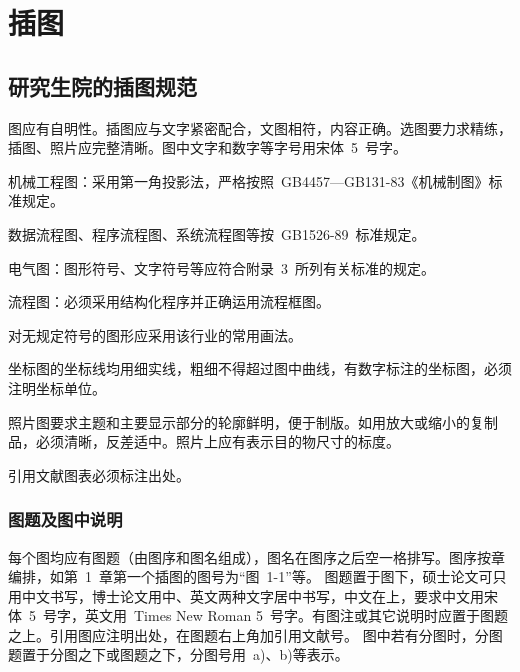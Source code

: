 
%
%
%

\chapter{插图}
\label{chap05}

\section{研究生院的插图规范}
图应有自明性。插图应与文字紧密配合，文图相符，内容正确。选图要力求精练，插图、照片应完整清晰。图中文字和数字等字号用宋体~5~号字。

机械工程图：采用第一角投影法，严格按照~GB4457---GB131-83《机械制图》标准规定。

数据流程图、程序流程图、系统流程图等按~GB1526-89~标准规定。

电气图：图形符号、文字符号等应符合附录~3~所列有关标准的规定。

流程图：必须采用结构化程序并正确运用流程框图。

对无规定符号的图形应采用该行业的常用画法。

坐标图的坐标线均用细实线，粗细不得超过图中曲线，有数字标注的坐标图，必须注明坐标单位。

照片图要求主题和主要显示部分的轮廓鲜明，便于制版。如用放大或缩小的复制品，必须清晰，反差适中。照片上应有表示目的物尺寸的标度。

引用文献图表必须标注出处。


\subsection{图题及图中说明}
每个图均应有图题（由图序和图名组成），图名在图序之后空一格排写。图序按章编排，如第~1~章第一个插图的图号为“图~1-1”等。
图题置于图下，硕士论文可只用中文书写，博士论文用中、英文两种文字居中书写，中文在上，要求中文用宋体~5~号字，英文用~Times New Roman 5~号字。有图注或其它说明时应置于图题之上。引用图应注明出处，在图题右上角加引用文献号。
图中若有分图时，分图题置于分图之下或图题之下，分图号用~a)、b)等表示。

